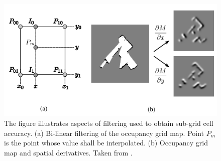 \begin{figure}[H]
	\centering
	\includegraphics[width=0.7\linewidth]{figs/hectorSLAM_filtering}
	\caption[Hector SLAM aspects of filtering]{The figure illustrates aspects of filtering used to obtain sub-grid cell accuracy. (a) Bi-linear filtering of the occupancy grid map. Point $P_m$ is the point whose value shall be interpolated. (b) Occupancy grid map and spatial derivatives. Taken from \cite{Kohlbrecher2011a}.}
	\label{fig:hectorslamfiltering}
\end{figure}

%




